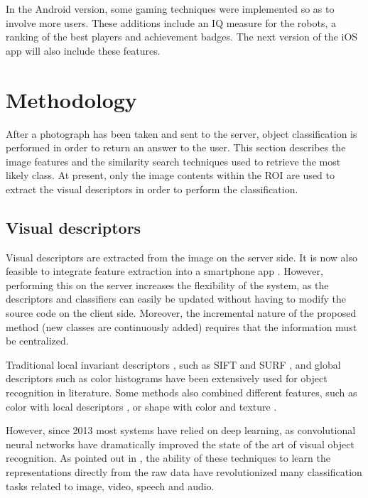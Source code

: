 \documentclass[final, twocolumn]{elsarticle}
\begin{document}
In the Android version, some gaming techniques were implemented so as to involve more users. These additions include an IQ measure for the robots, a ranking of the best players and achievement badges. The next version of the iOS app will also include these features.




\section{Methodology}
\label{methodology}

After a photograph has been taken and sent to the server, object classification is performed in order to return an answer to the user. This section describes the image features and the similarity search techniques used to retrieve the most likely class. At present, only the image contents within the ROI are used to extract the visual descriptors in order to perform the classification.


\subsection{Visual descriptors}
\label{features}

Visual descriptors are extracted from the image on the server side. It is now also feasible to integrate feature extraction into a smartphone app \cite{mobilenets}. However, performing this on the server increases the flexibility of the system, as the descriptors and classifiers can easily be updated without having to modify the source code on the client side. Moreover, the incremental nature of the proposed method (new classes are continuously added) requires that the information must be centralized.

Traditional local invariant descriptors \citep{Mikolajczyk2004ScaleDetectors}, such as SIFT   \cite{Lowe2004DistinctiveKeypoints} and SURF \cite{Bay2008Speeded-UpSURF}, and global descriptors such as color histograms \citep{vandeSande2010EvaluatingRecognition, Jeong2001Histogram-BasedRetrieval} have been extensively used for object recognition in literature. Some methods also combined different features, such as color with local descriptors \citep{Fernando2012DiscriminativeClassification}, or shape with color and texture \citep{Banerji2013NewClassification}.

However, since 2013 most systems have relied on deep learning, as convolutional neural networks have dramatically improved the state of the art of visual object recognition. As pointed out in \cite{LeCun2015DeepLearning}, the ability of these techniques to learn the representations directly from the raw data  have revolutionized many classification tasks related to image, video, speech and audio.
\end{document}
